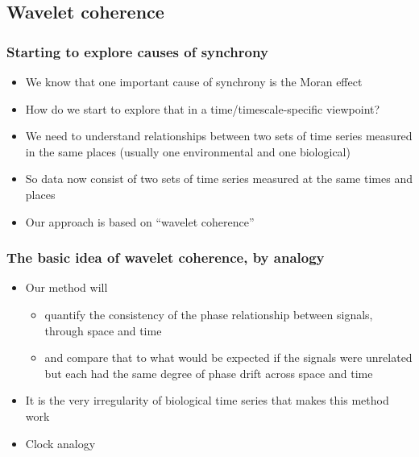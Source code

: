 \documentclass{beamer}
\begin{document}
\subsection{Wavelet coherence}

{
\begin{frame}
\frametitle{Starting to explore causes of synchrony}
\begin{itemize}
\item We know that one important cause of synchrony is the Moran effect
\item How do we start to explore that in a time/timescale-specific viewpoint?
\item We need to understand relationships between two sets of time series measured in the same places
(usually one environmental and one biological)
\item So data now consist of two sets of time series measured at the same times and places
\item Our approach is based on ``wavelet coherence''
\end{itemize}
\end{frame}}

\begin{frame}
\frametitle{The basic idea of wavelet coherence, by analogy}
\begin{itemize}
\item Our method will 
\begin{itemize}
\item quantify the consistency of the phase relationship between signals, through space and time
\item and compare that to what would be expected if the signals were unrelated but each had the same degree of phase drift across space and time
\end{itemize}
\item It is the very irregularity of biological time series that makes this method work
\item Clock analogy
\end{itemize}
\end{frame}
\end{document}
